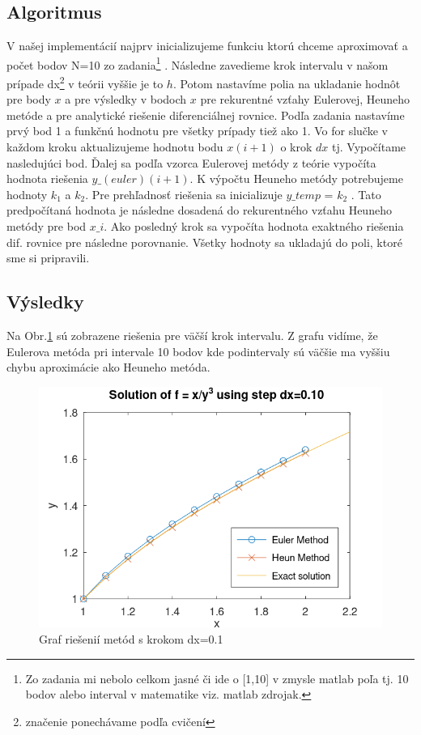 \documentclass{article}
\theoremstyle{definition}
\theoremstyle{remark}
\begin{document}
\subsection{Algoritmus}
V našej implementácií najprv inicializujeme funkciu ktorú chceme aproximovať a počet bodov N=10 zo zadania\footnote{Zo zadania mi nebolo celkom jasné či ide o [1,10] v zmysle matlab poľa tj. 10 bodov alebo interval v matematike viz. matlab zdrojak.} . Následne zavedieme krok intervalu v našom prípade dx\footnote{značenie ponechávame podľa cvičení} v teórii vyššie je to $h$. Potom nastavíme polia na ukladanie hodnôt pre body $x$ a pre výsledky v bodoch $x$ pre rekurentné vzťahy Eulerovej, Heuneho metóde a pre analytické riešenie diferenciálnej rovnice. Podľa zadania nastavíme prvý bod 1 a funkčnú hodnotu pre všetky prípady tiež ako 1. Vo for slučke v každom kroku aktualizujeme hodnotu bodu $x(i+1)$ o krok $dx$ tj. Vypočítame nasledujúci bod. Ďalej sa podľa vzorca Eulerovej metódy z teórie vypočíta hodnota riešenia $y\_(euler)(i+1)$. K výpočtu Heuneho metódy potrebujeme hodnoty $k_1$ a $k_2$. Pre prehľadnosť riešenia sa inicializuje $y\_temp$ = $k_2$ . Tato predpočítaná hodnota je následne dosadená do rekurentného vzťahu Heuneho metódy pre bod $x\_i$. Ako posledný krok sa vypočíta hodnota exaktného riešenia dif. rovnice pre následne porovnanie. Všetky hodnoty sa ukladajú do poli, ktoré sme si pripravili. 
\subsection{Výsledky}
Na Obr.\ref{fig:dx01} sú zobrazene riešenia pre väčší krok intervalu. Z grafu vidíme, že Eulerova metóda pri intervale 10 bodov kde podintervaly sú väčšie ma vyššiu chybu aproximácie ako Heuneho metóda.
\begin{figure}
  \centering
  \includegraphics[width=1\textwidth]{dx01.png}
  \caption{Graf riešenií metód s krokom dx=0.1}
  \label{fig:dx01}
\end{figure}
\end{document}
